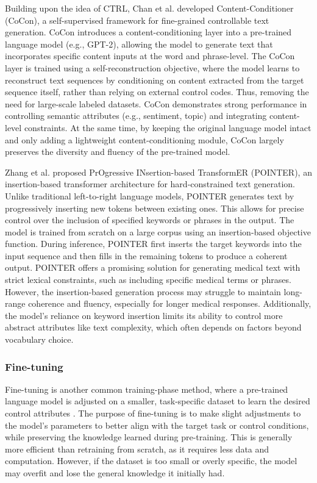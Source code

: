 Building upon the idea of CTRL, Chan et al. \cite{chan2021cocontentcontrollertextgeneration} developed Content-Conditioner (CoCon), a self-supervised framework for fine-grained controllable text generation. 
CoCon introduces a content-conditioning layer into a pre-trained language model (e.g., GPT-2), allowing the model to generate text that incorporates specific content inputs at the word and phrase-level. 
The CoCon layer is trained using a self-reconstruction objective, where the model learns to reconstruct text sequences by conditioning on content extracted from the target sequence itself, rather than relying on external control codes.
Thus, removing the need for large-scale labeled datasets.
CoCon demonstrates strong performance in controlling semantic attributes (e.g., sentiment, topic) and integrating content-level constraints.
At the same time, by keeping the original language model intact and only adding a lightweight content-conditioning module, CoCon largely preserves the diversity and fluency of the pre-trained model.

Zhang et al. \cite{zhang2020pointerconstrainedprogressivetext} proposed PrOgressive INsertion-based TransformER (POINTER), an insertion-based transformer architecture for hard-constrained text generation.
Unlike traditional left-to-right language models, POINTER generates text by progressively inserting new tokens between existing ones. 
This allows for precise control over the inclusion of specified keywords or phrases in the output. 
The model is trained from scratch on a large corpus using an insertion-based objective function. 
During inference, POINTER first inserts the target keywords into the input sequence and then fills in the remaining tokens to produce a coherent output.
POINTER offers a promising solution for generating medical text with strict lexical constraints, such as including specific medical terms or phrases. 
However, the insertion-based generation process may struggle to maintain long-range coherence and fluency, especially for longer medical responses. 
Additionally, the model's reliance on keyword insertion limits its ability to control more abstract attributes like text complexity, which often depends on factors beyond vocabulary choice.

\subsubsection{Fine-tuning}
Fine-tuning is another common training-phase method, where a pre-trained language model is adjusted on a smaller, task-specific dataset to learn the desired control attributes \cite{dathathri2020plugplaylanguagemodels}.
The purpose of fine-tuning is to make slight adjustments to the model's parameters to better align with the target task or control conditions, while preserving the knowledge learned during pre-training.
This is generally more efficient than retraining from scratch, as it requires less data and computation. 
However, if the dataset is too small or overly specific, the model may overfit and lose the general knowledge it initially had.

